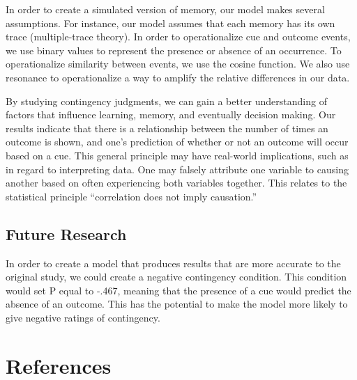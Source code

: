 \documentclass[
  english,
  man,floatsintext]{apa6}
\begin{document}
In order to create a simulated version of memory, our model makes several assumptions. For instance, our model assumes that each memory has its own trace (multiple-trace theory). In order to operationalize cue and outcome events, we use binary values to represent the presence or absence of an occurrence. To operationalize similarity between events, we use the cosine function. We also use resonance to operationalize a way to amplify the relative differences in our data.

By studying contingency judgments, we can gain a better understanding of factors that influence learning, memory, and eventually decision making. Our results indicate that there is a relationship between the number of times an outcome is shown, and one's prediction of whether or not an outcome will occur based on a cue. This general principle may have real-world implications, such as in regard to interpreting data. One may falsely attribute one variable to causing another based on often experiencing both variables together. This relates to the statistical principle ``correlation does not imply causation.''

\hypertarget{future-research}{%
\subsection{Future Research}\label{future-research}}

In order to create a model that produces results that are more accurate to the original study, we could create a negative contingency condition. This condition would set P equal to -.467, meaning that the presence of a cue would predict the absence of an outcome. This has the potential to make the model more likely to give negative ratings of contingency.

\newpage

\hypertarget{references}{%
\section{References}\label{references}}

\begingroup
\setlength{\parindent}{-0.5in}
\setlength{\leftskip}{0.5in}
\end{document}
